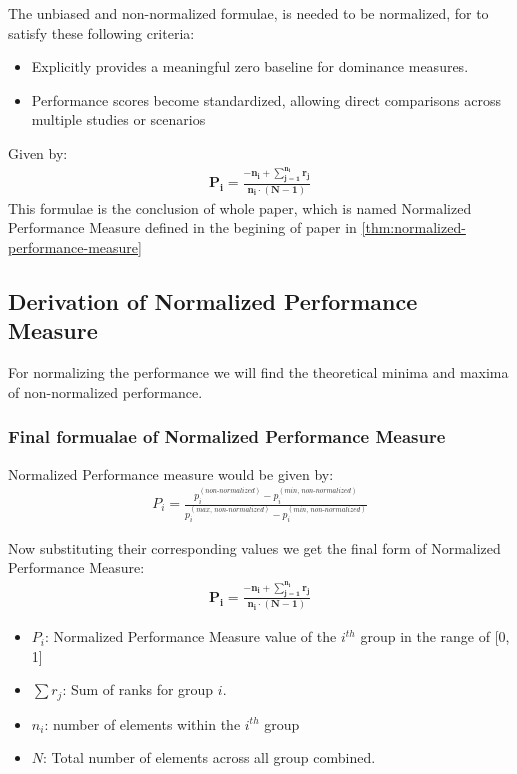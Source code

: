 \documentclass[a4paper,fleqn,review]{cas-sc}
\begin{document}
The unbiased and non-normalized formulae, is needed to be normalized, for to satisfy these following criteria:
\begin{itemize}
	\item Explicitly provides a meaningful zero baseline for dominance measures.
	\item Performance scores become standardized, allowing direct comparisons across multiple studies or scenarios
\end{itemize}
Given by:
\begin{align*}
	\boxed{
		\mathbf{
			P_i = \frac{-n_i +  \sum\limits_{j=1}^{n_i} r_j}{n_i \cdot (N - 1)}}
	}
\end{align*}
This formulae is the conclusion of whole paper, which is named Normalized Performance Measure defined in the begining of paper in \autoref{thm:normalized-performance-measure}

\subsection{Derivation of Normalized Performance Measure}

For normalizing the performance we will find the theoretical minima and maxima of non-normalized performance. 

\subsubsection{Final formualae of Normalized Performance Measure}
Normalized Performance measure would be given by:
\begin{align*}
	P_i = \frac{p_i^{(non\text{-}normalized)} - p_i^{(min, \, non\text{-}normalized)}}{p_i^{(max, \, non\text{-}normalized)} - p_i^{(min, \, non\text{-}normalized)}}
	\label{eq:normalized-simpler}
\end{align*}

Now substituting their corresponding values we get the final form of Normalized Performance Measure:
\begin{align*}
	\boxed{
		\mathbf{
			P_i = \frac{-n_i +  \sum\limits_{j=1}^{n_i} r_j}{n_i \cdot (N - 1)}}
	}
\end{align*}
\begin{itemize}
	\item[] \textbf{$P_i$}: Normalized Performance Measure value of the $i^{th}$ group in the range of [0, 1]
	\item[] \textbf{$\sum r_j$}: Sum of ranks for group $i$.
	\item[] \textbf{$n_i$}: number of elements within the $i^{th}$ group
	\item[] \textbf{$N$}: Total number of elements across all group combined.
\end{itemize}
\end{document}
